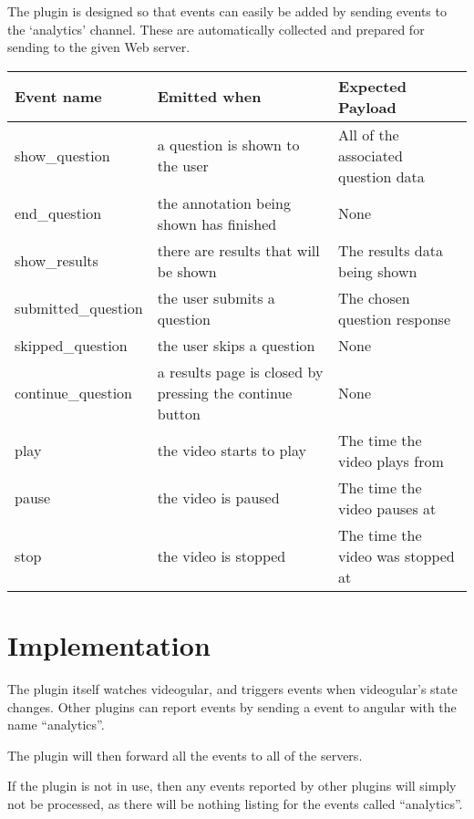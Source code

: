 The plugin is designed so that events can easily be added by sending events to the `analytics' channel. These are automatically collected and prepared for sending to the given Web server.

\begin{tabular}{p{3.2cm} p{6cm} p{4cm}}

\textbf{Event name} & \textbf{Emitted when} & \textbf{Expected Payload} \\
\hline
show\_question & a question is shown to the user & All of the associated question data \\
\hline
end\_question & the annotation being shown has finished & None \\
\hline
show\_results & there are results that will be shown & The results data being shown \\
\hline
submitted\_question & the user submits a question & The chosen question response \\
\hline
skipped\_question & the user skips a question & None \\
\hline
continue\_question & a results page is closed by pressing the continue button & None \\
\hline
play & the video starts to play & The time the video plays from \\
\hline
pause & the video is paused & The time the video pauses at \\
\hline
stop & the video is stopped & The time the video was stopped at \\
\end{tabular}

\section{Implementation}

The plugin itself watches videogular, and triggers events when videogular's state changes. Other plugins can report events by sending a event to angular with the name ``analytics''.

The plugin will then forward all the events to all of the servers.

If the plugin is not in use, then any events reported by other plugins will simply not be processed, as there will be nothing listing for the events called ``analytics''.

